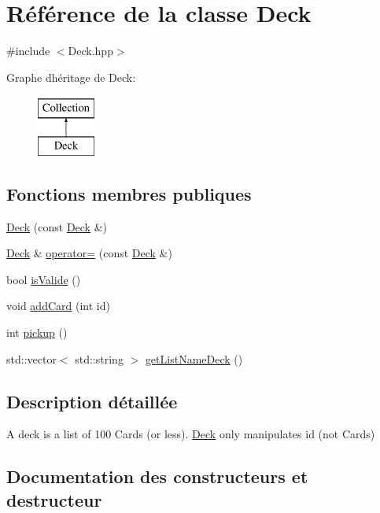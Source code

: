 \hypertarget{classDeck}{}\section{Référence de la classe Deck}
\label{classDeck}


{\ttfamily \#include $<$Deck.\+hpp$>$}

Graphe d\textquotesingle{}héritage de Deck\+:\begin{figure}[H]
\begin{center}
\leavevmode
\includegraphics[height=2.000000cm]{classDeck}
\end{center}
\end{figure}
\subsection*{Fonctions membres publiques}
\begin{DoxyCompactItemize}
\item 
\hyperlink{classDeck_a11233381fd5ea0b0b4e6288048f146fa}{Deck} (const \hyperlink{classDeck}{Deck} \&)
\item 
\hyperlink{classDeck}{Deck} \& \hyperlink{classDeck_a18c2a1c394b04e40b0b8ff46b7c2e972}{operator=} (const \hyperlink{classDeck}{Deck} \&)
\item 
bool \hyperlink{classDeck_a66cfb2d1adfb6b0b94ed25c8f5ca29f9}{is\+Valide} ()
\item 
void \hyperlink{classDeck_a50a5f34e7b296ef0a20c921e44f9c762}{add\+Card} (int id)
\item 
int \hyperlink{classDeck_af6338f8f48dadecb079446b698468735}{pickup} ()
\item 
std\+::vector$<$ std\+::string $>$ \hyperlink{classDeck_ab68c8a979926640071a2621d247e0452}{get\+List\+Name\+Deck} ()
\end{DoxyCompactItemize}


\subsection{Description détaillée}
A deck is a list of 100 Cards (or less). \hyperlink{classDeck}{Deck} only manipulates id (not Cards) 

\subsection{Documentation des constructeurs et destructeur}
\hypertarget{classDeck_a11233381fd5ea0b0b4e6288048f146fa}{}
